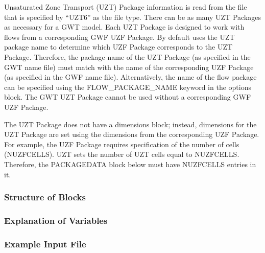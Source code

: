 Unsaturated Zone Transport (UZT) Package information is read from the file that is specified by ``UZT6'' as the file type.  There can be as many UZT Packages as necessary for a GWT model. Each UZT Package is designed to work with flows from a corresponding GWF UZF Package. By default \mf uses the UZT package name to determine which UZF Package corresponds to the UZT Package.  Therefore, the package name of the UZT Package (as specified in the GWT name file) must match with the name of the corresponding UZF Package (as specified in the GWF name file).  Alternatively, the name of the flow package can be specified using the FLOW\_PACKAGE\_NAME keyword in the options block.  The GWT UZT Package cannot be used without a corresponding GWF UZF Package.

The UZT Package does not have a dimensions block; instead, dimensions for the UZT Package are set using the dimensions from the corresponding UZF Package.  For example, the UZF Package requires specification of the number of cells (NUZFCELLS).  UZT sets the number of UZT cells equal to NUZFCELLS.  Therefore, the PACKAGEDATA block below must have NUZFCELLS entries in it.

\vspace{5mm}
\subsubsection{Structure of Blocks}




\vspace{5mm}
\subsubsection{Explanation of Variables}
\begin{description}

\end{description}

\vspace{5mm}
\subsubsection{Example Input File}


\vspace{5mm}
